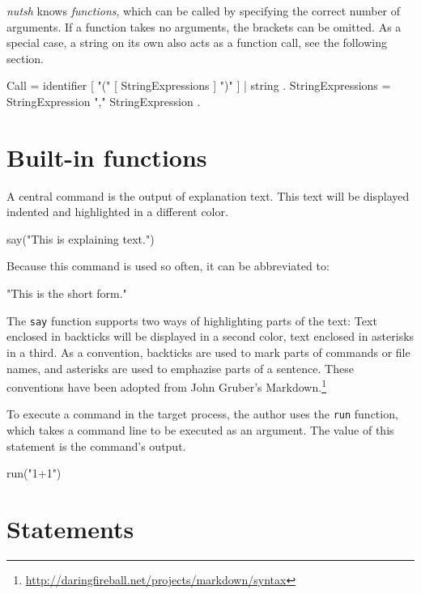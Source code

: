 \documentclass[paper=a4,twoside,abstract=on,cleardoublepage=empty,numbers=noenddot,toc=bib,12pt,appendixprefix=true]{scrreprt}
\begin{document}

\emph{nutsh} knows \emph{functions}, which can be called by specifying the correct number of arguments. If a function takes no arguments, the brackets can be omitted. As a special case, a string on its own also acts as a function call, see the following section.

\begin{ebnf}
Call = identifier [ "(" [ StringExpressions ] ")" ] |
        string .
StringExpressions = StringExpression { "," StringExpression } .
\end{ebnf}

\section{Built-in functions}

A central command is the output of explanation text. This text will be displayed indented and highlighted in a different color.

\begin{nutsh}
say("This is explaining text.")
\end{nutsh}
%
Because this command is used so often, it can be abbreviated to:

\begin{nutsh}
"This is the short form."
\end{nutsh}
%
The \texttt{say} function supports two ways of highlighting parts of the text: Text enclosed in backticks will be displayed in a second color, text enclosed in asterisks in a third. As a convention, backticks are used to mark parts of commands or file names, and asterisks are used to emphazise parts of a sentence. These conventions have been adopted from John Gruber's Markdown.\footnote{\url{http://daringfireball.net/projects/markdown/syntax}}

To execute a command in the target process, the author uses the \texttt{run} function, which takes a command line to be executed as an argument. The value of this statement is the command's output.

\begin{nutsh}
run("1+1")
\end{nutsh}

\section{Statements}
\label{sec:statements}

\end{document}
